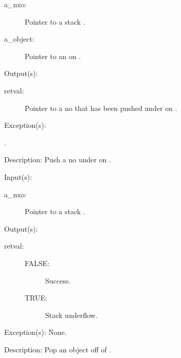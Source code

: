 \begin{capi}
\begin{capilist}
		\begin{description}\item[]
		\item[a\_nxo: ]
			Pointer to a stack .
		\item[a\_object: ]
			Pointer to an  on .
		\end{description}
	\item[Output(s): ]
		\begin{description}\item[]
		\item[retval: ]
			Pointer to a no  that has been pushed
			under  on .
		\end{description}
	\item[Exception(s): ]
		\begin{description}\item[]
		\item[.]
		\end{description}
	\item[Description: ]
		Push a no  under  on
		.
	\end{capilist}
\label{nxo_stack_pop}
	\begin{capilist}
	\item[Input(s): ]
		\begin{description}\item[]
		\item[a\_nxo: ]
			Pointer to a stack .
		\end{description}
	\item[Output(s): ]
		\begin{description}\item[]
		\item[retval: ]
			\begin{description}\item[]
			\item[FALSE: ]
				Success.
			\item[TRUE: ]
				Stack underflow.
			\end{description}
		\end{description}
	\item[Exception(s): ] None.
	\item[Description: ]
		Pop an object off of .
	\end{capilist}

\end{capi}
